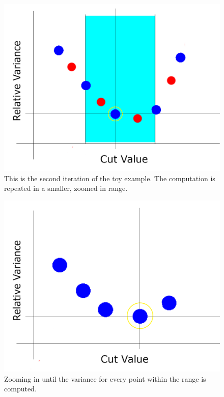 \begin{figure}[htbp]
	\centering
	\includegraphics[height=0.25 \textheight]{"fig/cbla/divide-and-zoom-in_3"}
	\caption[Illustration explaining the "Divid-and-Zoom-In" region split values computation method 3]{This is the second iteration of the toy example. The computation is repeated in a smaller, zoomed in range.}
	\label{fig:divide-and-zoom-in_3}
\end{figure}	
\begin{figure}[htbp]
	\centering
	\includegraphics[height=0.25 \textheight]{"fig/cbla/divide-and-zoom-in_4"}
	\caption[Illustration explaining the "Divid-and-Zoom-In" region split values computation method 4]{Zooming in until the variance for every point within the range is computed.}
	\label{fig:divide-and-zoom-in_4}
\end{figure}


